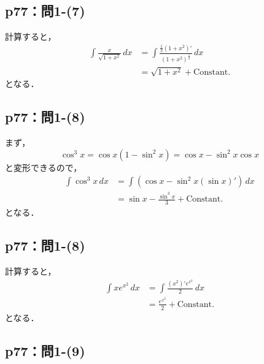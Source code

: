 \documentclass[uplatex,dvipdfmx,a4paper,10pt,fleqn]{jsarticle}
\newenvironment{tleftbar}{\begin{tbleftline}\setlength{\parindent}{1zw}}{\end{tbleftline}}
\begin{document}
\subsection*{p77：問1-(7)}

\begin{tleftbar}
    計算すると，
    \begin{align*} 
        \int \frac{x}{\sqrt{1+x^2}} \, dx & = \int \frac{\frac{1}{2}(1+x^2)'}{(1+x^2)^\frac{1}{2}} \, dx \\
        & = \sqrt{1+x^2}+\mathrm{Constant.}
    \end{align*}
    となる．
\end{tleftbar}

\subsection*{p77：問1-(8)}

\begin{tleftbar}
    まず，
    \[
        \cos ^3 x = \cos x (1-\sin ^2 x) = \cos x - \sin ^2 x \cos x 
    \]
    と変形できるので，
    \begin{align*} 
        \int \cos ^3 x \, dx & = \int (\cos x - \sin ^2 x (\sin x)' ) \, dx \\
        & = \sin x -\frac{\sin ^3 x}{3} + \mathrm{Constant.}
    \end{align*}
        となる．
\end{tleftbar}


\subsection*{p77：問1-(8)}

\begin{tleftbar}
    計算すると，
    \begin{align*} 
        \int x e^{x^2} \, dx & = \int \frac{(x^2)' e^{x^2}}{2} \, dx \\
        & = \frac{e^{x^2}}{2}+\mathrm{Constant.}
    \end{align*} 
    となる．
\end{tleftbar}


\subsection*{p77：問1-(9)}
\end{document}
